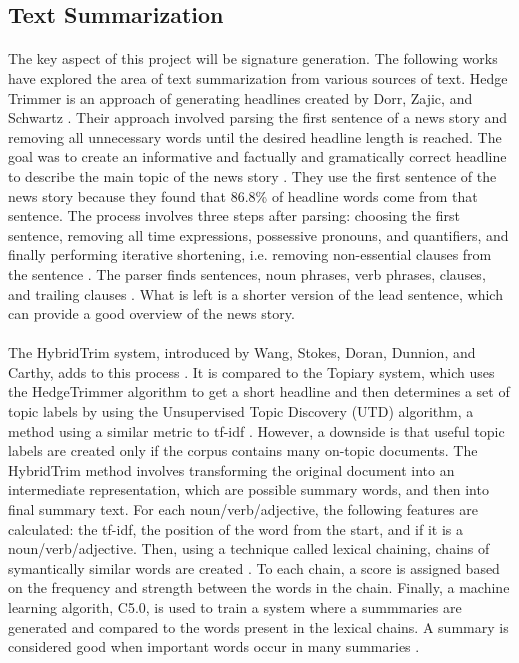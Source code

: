 \documentclass[11pt,titlepage]{report}
\begin{document}
\subsection{Text Summarization}
\paragraph{}
The key aspect of this project will be signature generation. The following works have explored the area of text summarization from various sources of text. Hedge Trimmer is an approach of generating headlines created by Dorr, Zajic, and Schwartz \cite{hedgetrimmer}. Their approach involved parsing the first sentence of a news story and removing all unnecessary words until the desired headline length is reached. The goal was to create an informative and factually and gramatically correct headline to describe the main topic of the news story \cite{hybrid}. They use the first sentence of the news story because they found that 86.8\% of headline words come from that sentence. The process involves three steps after parsing: choosing the first sentence, removing all time expressions, possessive pronouns, and quantifiers, and finally performing iterative shortening, i.e. removing non-essential clauses from the sentence \cite{hedgetrimmer,hybrid}. The parser finds sentences, noun phrases, verb phrases, clauses, and trailing clauses \cite{hedgetrimmer}. What is left is a shorter version of the lead sentence, which can provide a good overview of the news story.
\paragraph{}
The HybridTrim system, introduced by Wang, Stokes, Doran, Dunnion, and Carthy, adds to this process \cite{hybrid}. It is compared to the Topiary system, which uses the HedgeTrimmer algorithm to get a short headline and then determines a set of topic labels by using the Unsupervised Topic Discovery (UTD) algorithm, a method using a similar metric to tf-idf \cite{hybrid}. However, a downside is that useful topic labels are created only if the corpus contains many on-topic documents. The HybridTrim method involves transforming the original document into an intermediate representation, which are possible summary words, and then into final summary text. For each noun/verb/adjective, the following features are calculated: the tf-idf, the position of the word from the start, and if it is a noun/verb/adjective. Then, using a technique called lexical chaining, chains of symantically similar words are created \cite{hybrid}. To each chain, a score is assigned based on the frequency and strength between the words in the chain. Finally, a machine learning algorith, C5.0, is used to train a system where a summmaries are generated and compared to the words present in the lexical chains. A summary is considered good when important words occur in many summaries \cite{hybrid}.
\end{document}
